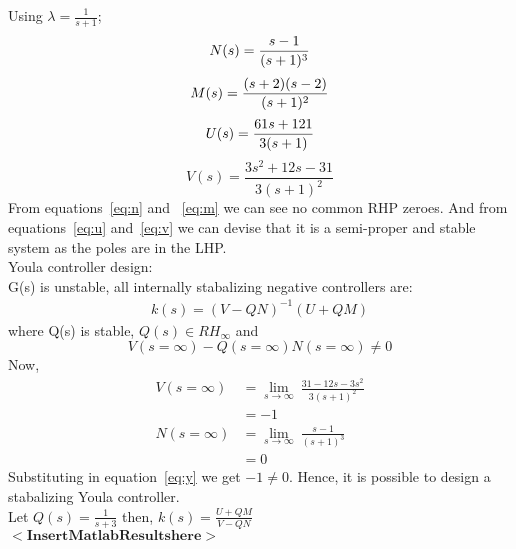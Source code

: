 \documentclass{scrreprt}
\begin{document}
Using $\lambda = \frac{1}{s+1}$;\\
\begin{equation}
N(s) = \frac{s-1}{(s+1)^3}\\
 \label{eq:n}
\end{equation}
\begin{equation}
M(s) = \frac{(s+2)(s-2)}{(s+1)^2}\\
 \label{eq:m}
\end{equation}
\begin{equation}
U(s) = \frac{61s+121}{3(s+1)}\\
 \label{eq:u}
\end{equation}
\begin{equation}
V(s) = \frac{3s^2+12s-31}{3(s+1)^2}
 \label{eq:v}
\end{equation}
From equations~\eqref{eq:n} and ~\eqref{eq:m} we can see no common RHP zeroes. And from equations~\eqref{eq:u} and~\eqref{eq:v} we can devise that it is a semi-proper and stable system as the poles are in the LHP.\\
Youla controller design:\\
G(s) is unstable, all internally stabalizing negative controllers are:\\
\begin{align*}
k(s) = (V-QN)^{-1}(U+QM)
\end{align*}
where Q(s) is stable, $Q(s) \in RH_{\infty}$ and
\begin{equation}
V(s=\infty)-Q(s=\infty)N(s=\infty) \neq 0
\label{eq:y}
\end{equation}
Now,
\begin{align*}
V(s=\infty) &= \lim_{s\to\infty}\: \frac{31-12s-3s^2}{3(s+1)^2}\\
	&= -1\\
N(s=\infty) &= \lim_{s\to\infty}\: \frac{s-1}{(s+1)^3}\\
	&= 0
\end{align*}
Substituting in equation~\eqref{eq:y} we get $-1 \neq 0$. Hence, it is possible to design a stabalizing Youla controller. \\
Let $Q(s) = \frac{1}{s+3}$ then, $k(s) = \frac{U+QM}{V-QN}$\\
$\bm{<Insert Matlab Results here>}$ \\\\
\end{document}
